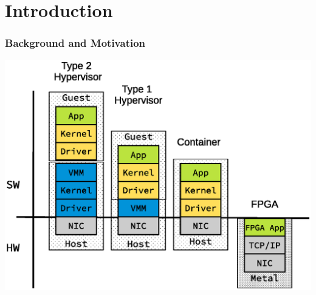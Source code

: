\section{Introduction}
\begin{frame}
  \frametitle{Background and Motivation}


\includegraphics[scale=0.5]{./background/server_configuration.eps}

\end{frame}



